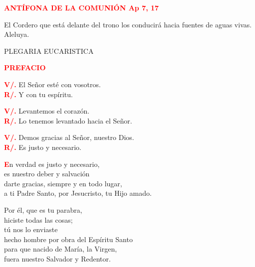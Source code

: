 \documentclass[12pt, letterpaper]{report}
\begin{document}
\Large {\bfseries \textcolor{red}{ANT\'IFONA DE LA COMUNI\'ON \hspace{1cm} Ap 7, 17}} \newline

\Large El Cordero que est\'a delante del trono los conducir\'a hacia fuentes de aguas vivas. Aleluya. \newline

\newpage

\begin{center}
\Large PLEGARIA EUCARISTICA
\end{center}

\Large {\bfseries \textcolor{red}{PREFACIO}} \newline

\noindent
\Large {\bfseries \textcolor{red}{V/.}} \hspace{0.5cm} El Se\~nor est\'e con vosotros. \\
\Large {\bfseries \textcolor{red}{R/.}} \hspace{0.5cm} Y con tu esp\'iritu. \newline

\noindent
\Large {\bfseries \textcolor{red}{V/.}} \hspace{0.5cm} Levantemos el coraz\'on. \\
\Large {\bfseries \textcolor{red}{R/.}} \hspace{0.5cm} Lo tenemos levantado hacia el Se\~nor. \newline

\noindent
\Large {\bfseries \textcolor{red}{V/.}} \hspace{0.5cm} Demos gracias al Se\~nor, nuestro Dios. \\
\Large {\bfseries \textcolor{red}{R/.}} \hspace{0.5cm} Es justo y necesario.

\lettrine[lines=1]{\bfseries \textcolor{red}{E}}{}\Large n verdad es justo y necesario, \\
es nuestro deber y salvaci\'on \\
darte gracias, siempre y en todo lugar, \\
a ti Padre Santo, por Jesucristo, tu Hijo amado. \newline

Por \'el, que es tu parabra, \\
hiciste todas las cosas; \\
t\'u nos lo enviaste \\
hecho hombre por obra del Esp\'iritu Santo \\
para que nacido de Mar\'ia, la Virgen, \\
fuera nuestro Salvador y Redentor. \newline
\end{document}
